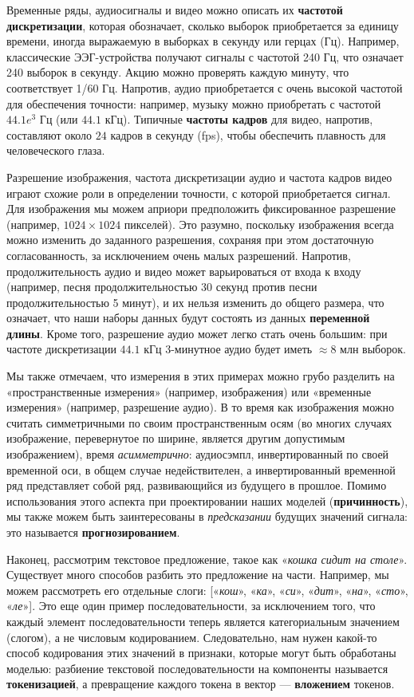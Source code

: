 Временные ряды, аудиосигналы и видео можно описать их \textbf{частотой дискретизации}, которая обозначает, сколько выборок приобретается за единицу времени, иногда выражаемую в выборках в секунду или герцах (Гц). Например, классические ЭЭГ-устройства получают сигналы с частотой 240 Гц, что означает 240 выборок в секунду. Акцию можно проверять каждую минуту, что соответствует 1/60 Гц. Напротив, аудио приобретается с очень высокой частотой для обеспечения точности: например, музыку можно приобретать с частотой $44.1e^3$ Гц (или $44.1$ кГц). Типичные \textbf{частоты кадров} для видео, напротив, составляют около $24$ кадров в секунду (fps), чтобы обеспечить плавность для человеческого глаза.

Разрешение изображения, частота дискретизации аудио и частота кадров видео играют схожие роли в определении точности, с которой приобретается сигнал. Для изображения мы можем априори предположить фиксированное разрешение (например, $1024 \times 1024$ пикселей). Это разумно, поскольку изображения всегда можно изменить до заданного разрешения, сохраняя при этом достаточную согласованность, за исключением очень малых разрешений. Напротив, продолжительность аудио и видео может варьироваться от входа к входу (например, песня продолжительностью 30 секунд против песни продолжительностью 5 минут), и их нельзя изменить до общего размера, что означает, что наши наборы данных будут состоять из данных \textbf{переменной длины}. Кроме того, разрешение аудио может легко стать очень большим: при частоте дискретизации $44.1$ кГц 3-минутное аудио будет иметь $\approx 8$ млн выборок.

Мы также отмечаем, что измерения в этих примерах можно грубо разделить на «пространственные измерения» (например, изображения) или «временные измерения» (например, разрешение аудио). В то время как изображения можно считать симметричными по своим пространственным осям (во многих случаях изображение, перевернутое по ширине, является другим допустимым изображением), время \textit{асимметрично}: аудиосэмпл, инвертированный по своей временной оси, в общем случае недействителен, а инвертированный временной ряд представляет собой ряд, развивающийся из будущего в прошлое. Помимо использования этого аспекта при проектировании наших моделей (\textbf{причинность}), мы также можем быть заинтересованы в \textit{предсказании} будущих значений сигнала: это называется \textbf{прогнозированием}.

Наконец, рассмотрим текстовое предложение, такое как «\textit{кошка сидит на столе}». Существует много способов разбить это предложение на части. Например, мы можем рассмотреть его отдельные слоги: [«\textit{кош}», «\textit{ка}», «\textit{си}», «\textit{дит}», «\textit{на}», «\textit{сто}», «\textit{ле}»]. Это еще один пример последовательности, за исключением того, что каждый элемент последовательности теперь является категориальным значением (слогом), а не числовым кодированием. Следовательно, нам нужен какой-то способ кодирования этих значений в признаки, которые могут быть обработаны моделью: разбиение текстовой последовательности на компоненты называется \textbf{токенизацией}, а превращение каждого токена в вектор — \textbf{вложением} токенов.

